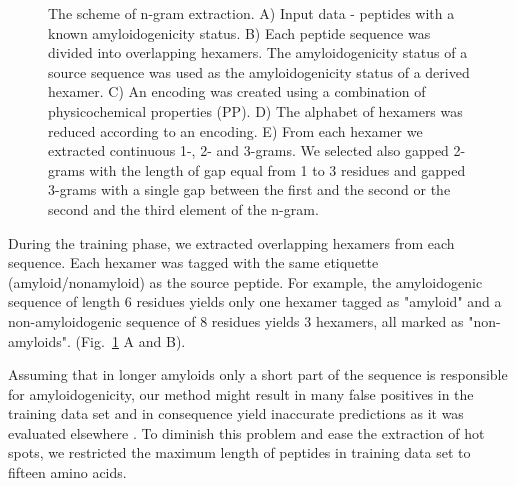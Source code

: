 \documentclass[a4,center,fleqn]{NAR}
\begin{document}
\begin{figure}[!tpb]
  \caption{The scheme of n-gram extraction. A) Input data - peptides with a 
known amyloidogenicity status. B) Each peptide sequence was divided into 
overlapping hexamers. The amyloidogenicity status of a source sequence was used 
as the amyloidogenicity status of a derived hexamer. C) An encoding was created 
using a combination of physicochemical properties (PP). D) The alphabet of 
hexamers was reduced according to an encoding. E) From each hexamer we 
extracted continuous 1-, 2- and 3-grams. We selected also gapped 2-grams with 
the length of gap equal from 1 to 3 residues and gapped 3-grams with a single 
gap between the first and the second or the second and the third element of the 
n-gram.}\label{fig:ngram_scheme}
\end{figure}

  During the training phase, we extracted overlapping hexamers from each sequence. 
%
%
%
Each hexamer was tagged with the same etiquette (amyloid/nonamyloid) as the 
source peptide. For example, the amyloidogenic sequence of length 6 residues 
yields only one 
%
%
%
%
%
%
%
%
%
hexamer tagged as "amyloid" and a non-amyloidogenic sequence of 8 residues yields 
3 hexamers, all marked as "non-amyloids". (Fig.~\ref{fig:ngram_scheme} A and B). 

  Assuming that in longer amyloids only a short part of the sequence is 
responsible for amyloidogenicity, our method might result in many false 
positives in the training data set and in consequence yield inaccurate 
predictions as it was evaluated elsewhere \citep{kotulska_amyloid_2013}. To 
diminish this problem and ease the extraction of hot spots, we restricted the 
maximum length of peptides in training data set to fifteen amino acids.

%
%
%
\end{document}

